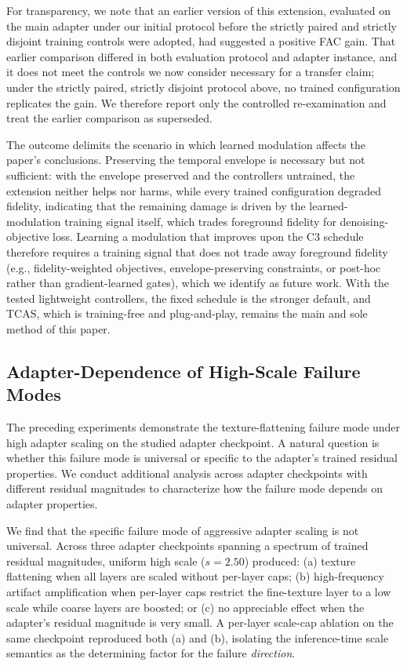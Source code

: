 \documentclass[times,twocolumn,final]{elsarticle}
\begin{document}
For transparency, we note that an earlier version of this extension, evaluated on the main adapter under our initial protocol before the strictly paired and strictly disjoint training controls were adopted, had suggested a positive FAC gain. That earlier comparison differed in both evaluation protocol and adapter instance, and it does not meet the controls we now consider necessary for a transfer claim; under the strictly paired, strictly disjoint protocol above, no trained configuration replicates the gain. We therefore report only the controlled re-examination and treat the earlier comparison as superseded.

The outcome delimits the scenario in which learned modulation affects the paper's conclusions. Preserving the temporal envelope is necessary but not sufficient: with the envelope preserved and the controllers untrained, the extension neither helps nor harms, while every trained configuration degraded fidelity, indicating that the remaining damage is driven by the learned-modulation training signal itself, which trades foreground fidelity for denoising-objective loss. Learning a modulation that improves upon the C3 schedule therefore requires a training signal that does not trade away foreground fidelity (e.g., fidelity-weighted objectives, envelope-preserving constraints, or post-hoc rather than gradient-learned gates), which we identify as future work. With the tested lightweight controllers, the fixed schedule is the stronger default, and TCAS, which is training-free and plug-and-play, remains the main and sole method of this paper.

\FloatBarrier

\subsection{Adapter-Dependence of High-Scale Failure Modes}
\label{subsec:adapterdep}

The preceding experiments demonstrate the texture-flattening failure mode under high adapter scaling on the studied adapter checkpoint. A natural question is whether this failure mode is universal or specific to the adapter's trained residual properties. We conduct additional analysis across adapter checkpoints with different residual magnitudes to characterize how the failure mode depends on adapter properties.

We find that the specific failure mode of aggressive adapter scaling is not universal. Across three adapter checkpoints spanning a spectrum of trained residual magnitudes, uniform high scale ($s = 2.50$) produced: (a) texture flattening when all layers are scaled without per-layer caps; (b) high-frequency artifact amplification when per-layer caps restrict the fine-texture layer to a low scale while coarse layers are boosted; or (c) no appreciable effect when the adapter's residual magnitude is very small. A per-layer scale-cap ablation on the same checkpoint reproduced both (a) and (b), isolating the inference-time scale semantics as the determining factor for the failure \emph{direction}.
\end{document}
